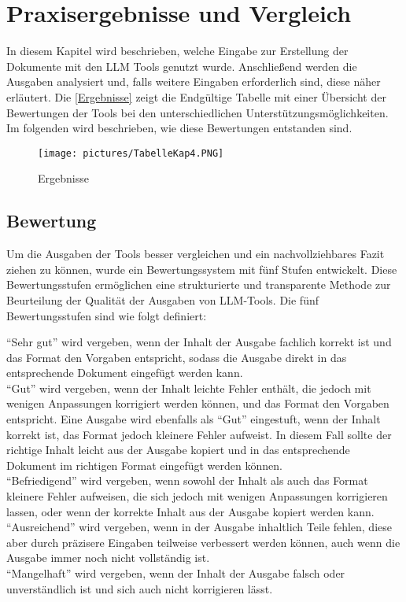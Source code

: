 
\chapter{Praxisergebnisse und Vergleich} 

In diesem Kapitel wird beschrieben, welche Eingabe zur Erstellung der Dokumente mit den LLM Tools 
genutzt wurde. Anschließend werden die Ausgaben analysiert und, falls weitere Eingaben erforderlich sind, 
diese näher erläutert. Die \autoref{Ergebnisse} zeigt die Endgültige Tabelle mit einer Übersicht der Bewertungen 
der Tools bei den unterschiedlichen Unterstützungsmöglichkeiten. Im folgenden wird beschrieben, wie diese Bewertungen 
entstanden sind.

\begin{figure}[H]
    \centering
    \texttt{[image: pictures/TabelleKap4.PNG]}
    \caption{Ergebnisse}
    \label{Ergebnisse}
\end{figure}

\section*{Bewertung}

Um die Ausgaben der Tools besser vergleichen und ein nachvollziehbares Fazit ziehen zu können, wurde ein Bewertungssystem 
mit fünf Stufen entwickelt. Diese Bewertungsstufen ermöglichen eine strukturierte und transparente Methode zur Beurteilung 
der Qualität der Ausgaben von LLM-Tools. Die fünf Bewertungsstufen sind wie folgt definiert:

``Sehr gut'' wird vergeben, wenn der Inhalt der Ausgabe fachlich korrekt ist und das Format den Vorgaben entspricht, sodass 
die Ausgabe direkt in das entsprechende Dokument eingefügt werden kann.\\
``Gut'' wird vergeben, wenn der Inhalt leichte Fehler enthält, die jedoch mit wenigen Anpassungen korrigiert 
werden können, und das Format den Vorgaben entspricht. Eine Ausgabe wird ebenfalls als ``Gut'' eingestuft, wenn der Inhalt 
korrekt ist, das Format jedoch kleinere Fehler aufweist. In diesem Fall sollte der richtige Inhalt leicht aus der Ausgabe 
kopiert und in das entsprechende Dokument im richtigen Format eingefügt werden können.\\
``Befriedigend'' wird vergeben, wenn sowohl der Inhalt als auch das Format kleinere Fehler aufweisen, die sich 
jedoch mit wenigen Anpassungen korrigieren lassen, oder wenn der korrekte Inhalt aus der Ausgabe kopiert werden kann.\\
``Ausreichend'' wird vergeben, wenn in der Ausgabe inhaltlich Teile fehlen, diese aber durch präzisere Eingaben 
teilweise verbessert werden können, auch wenn die Ausgabe immer noch nicht vollständig ist.\\
``Mangelhaft'' wird vergeben, wenn der Inhalt der Ausgabe falsch oder unverständlich ist und sich 
auch nicht korrigieren lässt.

